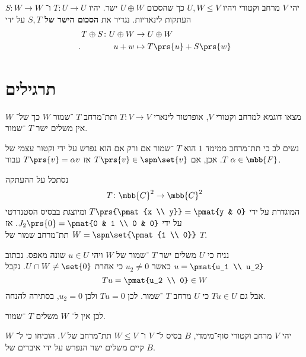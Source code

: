 \documentclass[article, 10pt,oneside]{article}
\renewcommand{\emph}[1]{\textbf{#1}}
\begin{document}
\begin{definition}
יהי
$V$
מרחב וקטורי ויהיו
$U,W \leq V$
כך שהסכום
$U \oplus W$
ישר.
יהיו
$T \colon U \to U$
ו־%
$S \colon W \to W$
העתקות לינאריות. נגדיר את
\emph{הסכום הישר של
$S,T$}
על ידי
\begin{align*}
T \oplus S \colon U \oplus W &\to U \oplus W \\
\text{.} \hspace{4em} u+w &\mapsto T\prs{u} + S\prs{w}
\end{align*}
\end{definition}

\section*{תרגילים}

\begin{exercise}
מצאו דוגמא למרחב וקטורי
$V$,
אופרטור לינארי
$T \colon V \to V$
ותת־מרחב
$T$%
־שמור
$W$
כך של־%
$W$
אין משלים ישר
$T$%
־שמור.
\end{exercise}

\begin{solution}
נשים לב כי תת־מרחב ממימד
$1$
הוא
$T$%
־שמור אם ורק אם הוא נפרש על ידי וקטור עצמי של
$T$.
אכן, אם
$T\prs{v} \in \spn\set{v}$
אז
$T\prs{v} = \alpha v$
עבור
$\alpha \in \mbb{F}$.

נסתכל על ההעתקה
\[T \colon \mbb{C}^2 \to \mbb{C}^2\]
המוגדרת על ידי
$T\prs{\pmat{x \\ y}} = \pmat{y & 0}$
ומיוצגת בבסיס הסטנדרטי על ידי
$J_2\prs{0} = \pmat{0 & 1 \\ 0 & 0}$.
אז
$W = \spn\set{\pmat{1 \\ 0}}$
תת־מרחב שמור של
$T$.

נניח כי
$U$
משלים ישר
$T$%
־שמור של
$W$
ויהי
$u \in U$
שונה מאפס.
נכתוב
$u = \pmat{u_1 \\ u_2}$
כאשר
$u_2 \neq 0$
כי אחרת
$U \cap W \neq \set{0}$.
נקבל
\[Tu = \pmat{u_2 \\ 0} \in W\]
אבל גם
$Tu \in U$
כי
$U$
מרחב
$T$%
־שמור.
לכן
$Tu = 0$
ולכן
$u_2 = 0$,
בסתירה להנחה.

לכן אין ל־%
$W$
משלים
$T$%
־שמור.
\end{solution}

\begin{exercise}
יהי
$V$
מרחב וקטורי סוף־מימדי,
$B$
בסיס ל־%
$V$
ו־%
$W \leq V$
תת־מרחב של
$V$.
הוכיחו כי ל־%
$W$
קיים משלים ישר הנפרש על ידי איברים של
$B$.
\end{exercise}
\end{document}
